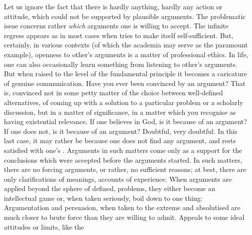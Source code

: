 Let us ignore the fact that there is hardly anything, hardly any action or
attitude, which could not be supported by plausible arguments. The problematic
issue concerns rather {\em which} arguments one is willing to accept. The
infinite regress appears as in most cases when  tries
to make itself self-sufficient. But, certainly, in various contexts (of which
the academia may serve as the paramount example), openness to other's arguments
is a matter of professional ethics.  In life, one can also occasionally learn
something from listening to other's arguments.  But when raised to the level of
the fundamental principle it becomes a caricature of genuine communication.
Have you ever been convinced by an argument?  That is, convinced not in some
petty matter of the choice between well-defined alternatives, of coming up with
a solution to a particular problem or a scholarly discussion, but in a matter of
significance, in a matter which you recognise as having existential relevance.
If one believes in God, is it because of an argument?  If one does not, is it
because of an argument? Doubtful, very doubtful. In this last case, it may
rather be because one does not find any argument, and rests satisfied with one's
. Arguments in such matters come only as a 
support for the conclusions which were accepted before the arguments started. In
such matters, there are no forcing arguments, or rather, no sufficient reasons;
at best, there are only clarifications of meanings, accounts of experience.
When arguments are applied beyond the sphere of  defined,
 problems, they either become an intellectual game or, when taken
seriously, boil down to one thing:  Argumentation and persuasion, when taken to the
extreme and {absolutised} are much closer to brute force than they are willing
to admit.  Appeals to some ideal attitudes or limits, like the
